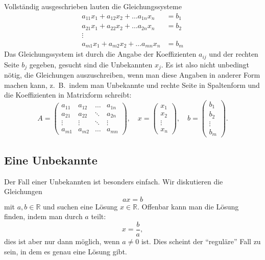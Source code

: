 Vollständig ausgeschrieben lauten die Gleichungssysteme
\begin{align*}
a_{11}x_1+a_{12}x_2+\dots a_{1n}x_n&=b_1\\
a_{21}x_1+a_{22}x_2+\dots a_{2n}x_n&=b_2\\
\vdots\\
a_{m1}x_1+a_{m2}x_2+\dots a_{mn}x_n&=b_m
\end{align*}
Das Gleichungssystem ist durch die Angabe der Koeffizienten $a_{ij}$
und der rechten Seite $b_j$ gegeben, gesucht sind die Unbekannten $x_j$.
Es ist also nicht unbedingt nötig, die Gleichungen auszuschreiben,
wenn man diese Angaben in anderer Form machen kann, z.~B.~indem man
Unbekannte und rechte Seite in Spaltenform und die Koeffizienten in
Matrixform schreibt:
\[
A=\begin{pmatrix}
a_{11}&a_{12}&\dots &a_{1n}\\
a_{21}&a_{22}&\ddots&a_{2n}\\
\vdots&\vdots&\ddots&\vdots\\
a_{m1}&a_{m2}&\dots&a_{mn}
\end{pmatrix}
,\quad
x=\begin{pmatrix}
x_1\\x_2\\\vdots\\x_n
\end{pmatrix},
\quad
b=\begin{pmatrix}
b_1\\b_2\\\vdots\\b_m
\end{pmatrix}.
\]

\subsection{Eine Unbekannte}
Der Fall einer Unbekannten ist besonders einfach.
Wir diskutieren die Gleichungen
\[
ax=b
\]
mit $a,b\in\mathbb R$ und suchen eine Lösung $x\in\mathbb R$.
Offenbar kann man die Lösung finden, indem man durch $a$ teilt:
\[
x=\frac{b}{a},
\]
dies ist aber nur dann möglich, wenn $a\ne 0$ ist.
Dies scheint
der ``reguläre'' Fall zu sein, in dem es genau eine Lösung gibt.


